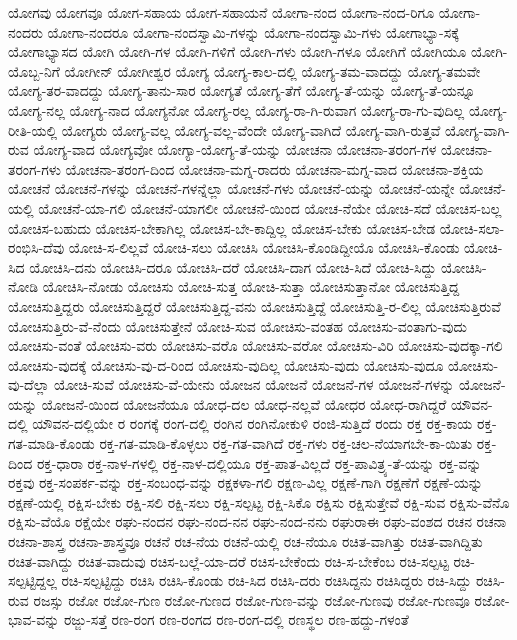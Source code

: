 {ಯೋಗವು
ಯೋಗವೂ
ಯೋಗ-ಸಹಾಯ
ಯೋಗ-ಸಹಾಯನೆ
ಯೋಗಾ-ನಂದ
ಯೋಗಾ-ನಂದ-ರಿಗೂ
ಯೋಗಾ-ನಂದರು
ಯೋಗಾ-ನಂದರೂ
ಯೋಗಾ-ನಂದಸ್ವಾಮಿ-ಗಳನ್ನು
ಯೋಗಾ-ನಂದಸ್ವಾಮಿ-ಗಳು
ಯೋಗಾಭ್ಯಾ-ಸಕ್ಕೆ
ಯೋಗಾಭ್ಯಾಸದ
ಯೋಗಿ
ಯೋಗಿ-ಗಳ
ಯೋಗಿ-ಗಳಿಗೆ
ಯೋಗಿ-ಗಳು
ಯೋಗಿ-ಗಳೂ
ಯೋಗಿಗೆ
ಯೋಗಿಯೂ
ಯೋಗಿ-ಯೊಬ್ಬ-ನಿಗೆ
ಯೋಗೀನ್
ಯೋಗೀಶ್ವರ
ಯೋಗ್ಯ
ಯೋಗ್ಯ-ಕಾಲ-ದಲ್ಲಿ
ಯೋಗ್ಯ-ತಮ-ವಾದದ್ದು
ಯೋಗ್ಯ-ತಮವೇ
ಯೋಗ್ಯ-ತರ-ವಾದದ್ದು
ಯೋಗ್ಯ-ತಾನು-ಸಾರ
ಯೋಗ್ಯತೆ
ಯೋಗ್ಯ-ತೆಗೆ
ಯೋಗ್ಯ-ತೆ-ಯನ್ನು
ಯೋಗ್ಯ-ತೆ-ಯನ್ನೂ
ಯೋಗ್ಯ-ನಲ್ಲ
ಯೋಗ್ಯ-ನಾದ
ಯೋಗ್ಯನೋ
ಯೋಗ್ಯ-ರಲ್ಲ
ಯೋಗ್ಯ-ರಾ-ಗಿ-ರುವಾಗ
ಯೋಗ್ಯ-ರಾ-ಗು-ವುದಿಲ್ಲ
ಯೋಗ್ಯ-ರೀತಿ-ಯಲ್ಲಿ
ಯೋಗ್ಯರು
ಯೋಗ್ಯ-ವಲ್ಲ
ಯೋಗ್ಯ-ವಲ್ಲ-ವೆಂದೇ
ಯೋಗ್ಯ-ವಾಗಿದೆ
ಯೋಗ್ಯ-ವಾಗಿ-ರುತ್ತವೆ
ಯೋಗ್ಯ-ವಾಗಿ-ರುವ
ಯೋಗ್ಯ-ವಾದ
ಯೋಗ್ಯವೋ
ಯೋಗ್ಯಾ-ಯೋಗ್ಯ-ತೆ-ಯನ್ನು
ಯೋಚನಾ
ಯೋಚನಾ-ತರಂಗ-ಗಳ
ಯೋಚನಾ-ತರಂಗ-ಗಳು
ಯೋಚನಾ-ತರಂಗ-ದಿಂದ
ಯೋಚನಾ-ಮಗ್ನ-ರಾದರು
ಯೋಚನಾ-ಮಗ್ನ-ವಾದ
ಯೋಚನಾ-ಶಕ್ತಿಯ
ಯೋಚನೆ
ಯೋಚನೆ-ಗಳನ್ನು
ಯೋಚನೆ-ಗಳನ್ನೆಲ್ಲಾ
ಯೋಚನೆ-ಗಳು
ಯೋಚನೆ-ಯನ್ನು
ಯೋಚನೆ-ಯನ್ನೇ
ಯೋಚನೆ-ಯಲ್ಲಿ
ಯೋಚನೆ-ಯಾ-ಗಲಿ
ಯೋಚನೆ-ಯಾಗಲೀ
ಯೋಚನೆ-ಯಿಂದ
ಯೋಚ-ನೆಯೇ
ಯೋಚಿ-ಸದೆ
ಯೋಚಿಸ-ಬಲ್ಲ
ಯೋಚಿಸ-ಬಹುದು
ಯೋಚಿಸ-ಬೇಕಾಗಿಲ್ಲ
ಯೋಚಿಸ-ಬೇ-ಕಾದ್ದಿಲ್ಲ
ಯೋಚಿಸ-ಬೇಕು
ಯೋಚಿಸ-ಬೇಡ
ಯೋಚಿ-ಸಲಾ-ರಂಭಿಸಿ-ದೆವು
ಯೋಚಿ-ಸ-ಲಿಲ್ಲವೆ
ಯೋಚಿ-ಸಲು
ಯೋಚಿಸಿ
ಯೋಚಿಸಿ-ಕೊಂಡಿದ್ದೀಯೊ
ಯೋಚಿಸಿ-ಕೊಂಡು
ಯೋಚಿ-ಸಿದ
ಯೋಚಿಸಿ-ದನು
ಯೋಚಿಸಿ-ದರೂ
ಯೋಚಿಸಿ-ದರೆ
ಯೋಚಿಸಿ-ದಾಗ
ಯೋಚಿ-ಸಿದೆ
ಯೋಚಿ-ಸಿದ್ದು
ಯೋಚಿಸಿ-ನೋಡಿ
ಯೋಚಿಸಿ-ನೋಡು
ಯೋಚಿಸು
ಯೋಚಿ-ಸುತ್ತ
ಯೋಚಿ-ಸುತ್ತಾ
ಯೋಚಿಸುತ್ತಾನೋ
ಯೋಚಿಸುತ್ತಿದ್ದ
ಯೋಚಿಸುತ್ತಿದ್ದರು
ಯೋಚಿಸುತ್ತಿದ್ದರೆ
ಯೋಚಿಸುತ್ತಿದ್ದ-ವನು
ಯೋಚಿಸುತ್ತಿದ್ದೆ
ಯೋಚಿಸುತ್ತಿ-ರ-ಲಿಲ್ಲ
ಯೋಚಿಸುತ್ತಿರುವೆ
ಯೋಚಿಸುತ್ತಿರು-ವೆ-ನೆಂದು
ಯೋಚಿಸುತ್ತೇನೆ
ಯೋಚಿ-ಸುವ
ಯೋಚಿಸು-ವಂತಹ
ಯೋಚಿಸು-ವಂತಾಗು-ವುದು
ಯೋಚಿಸು-ವಂತೆ
ಯೋಚಿಸು-ವರು
ಯೋಚಿಸು-ವರೊ
ಯೋಚಿಸು-ವರೋ
ಯೋಚಿಸು-ವಿರಿ
ಯೋಚಿಸು-ವುದಕ್ಕಾ-ಗಲಿ
ಯೋಚಿಸು-ವುದಕ್ಕೆ
ಯೋಚಿಸು-ವು-ದ-ರಿಂದ
ಯೋಚಿಸು-ವುದಿಲ್ಲ
ಯೋಚಿಸು-ವುದು
ಯೋಚಿಸು-ವುದೂ
ಯೋಚಿಸು-ವು-ದೆಲ್ಲಾ
ಯೋಚಿ-ಸುವೆ
ಯೋಚಿಸು-ವೆ-ಯೇನು
ಯೋಜನ
ಯೋಜನೆ
ಯೋಜನೆ-ಗಳ
ಯೋಜನೆ-ಗಳನ್ನು
ಯೋಜನೆ-ಯನ್ನು
ಯೋಜನೆ-ಯಿಂದ
ಯೋಜನೆಯೂ
ಯೋಧ-ದಲ
ಯೋಧ-ನಲ್ಲವೆ
ಯೋಧರ
ಯೋಧ-ರಾಗಿದ್ದರೆ
ಯೌವನ-ದಲ್ಲಿ
ಯೌವನ-ದಲ್ಲಿಯೇ
ರ
ರಂಗಕ್ಕೆ
ರಂಗ-ದಲ್ಲಿ
ರಂಗಿನ
ರಂಗಿನೋಕುಳಿ
ರಂಜಿ-ಸುತ್ತಿದೆ
ರಂದು
ರಕ್ತ
ರಕ್ತ-ಕಾಯ
ರಕ್ತ-ಗತ-ಮಾಡಿ-ಕೊಂಡು
ರಕ್ತ-ಗತ-ಮಾಡಿ-ಕೊಳ್ಳಲು
ರಕ್ತ-ಗತ-ವಾಗಿದೆ
ರಕ್ತ-ಗಳು
ರಕ್ತ-ಚಲ-ನೆಯಾಗಬೇ-ಕಾ-ಯಿತು
ರಕ್ತ-ದಿಂದ
ರಕ್ತ-ಧಾರಾ
ರಕ್ತ-ನಾಳ-ಗಳಲ್ಲಿ
ರಕ್ತ-ನಾಳ-ದಲ್ಲಿಯೂ
ರಕ್ತ-ಪಾತ-ವಿಲ್ಲದೆ
ರಕ್ತ-ಪಾವಿತ್ರ್ಯ-ತೆ-ಯನ್ನು
ರಕ್ತ-ವನ್ನು
ರಕ್ತವು
ರಕ್ತ-ಸಂಪರ್ಕ-ವನ್ನು
ರಕ್ತ-ಸಂಬಂಧ-ವನ್ನು
ರಕ್ಷಕಳಾ-ಗಲಿ
ರಕ್ಷಣ-ವಿಲ್ಲ
ರಕ್ಷಣೆ-ಗಾಗಿ
ರಕ್ಷಣೆಗೆ
ರಕ್ಷಣೆ-ಯನ್ನು
ರಕ್ಷಣೆ-ಯಲ್ಲಿ
ರಕ್ಷಿಸ-ಬೇಕು
ರಕ್ಷಿ-ಸಲಿ
ರಕ್ಷಿ-ಸಲು
ರಕ್ಷಿ-ಸಲ್ಪಟ್ಟ
ರಕ್ಷಿ-ಸಿಕೊ
ರಕ್ಷಿಸು
ರಕ್ಷಿಸುತ್ತೇವೆ
ರಕ್ಷಿ-ಸುವ
ರಕ್ಷಿಸು-ವೆನೊ
ರಕ್ಷಿಸು-ವೆಯೊ
ರಕ್ಷೆಯೇ
ರಘು-ನಂದನ
ರಘು-ನಂದ-ನನ
ರಘು-ನಂದ-ನನು
ರಘುರಾಈ
ರಘು-ವಂಶದ
ರಚನ
ರಚನಾ
ರಚನಾ-ಶಾಸ್ತ್ರ
ರಚನಾ-ಶಾಸ್ತ್ರವೂ
ರಚನೆ
ರಚ-ನೆಯ
ರಚನೆ-ಯಲ್ಲಿ
ರಚ-ನೆಯೂ
ರಚಿತ-ವಾಗಿತ್ತು
ರಚಿತ-ವಾಗಿದ್ದಿತು
ರಚಿತ-ವಾಗಿದ್ದು
ರಚಿತ-ವಾದುವು
ರಚಿಸ-ಬಲ್ಲೆ-ಯಾ-ದರೆ
ರಚಿಸ-ಬೇಕೆಂದು
ರಚಿ-ಸ-ಬೇಕೆಂಬ
ರಚಿ-ಸಲ್ಪಟ್ಟ
ರಚಿ-ಸಲ್ಪಟ್ಟಿದ್ದಲ್ಲ
ರಚಿ-ಸಲ್ಪಟ್ಟಿದ್ದು
ರಚಿಸಿ
ರಚಿಸಿ-ಕೊಂಡು
ರಚಿ-ಸಿದ
ರಚಿಸಿ-ದರು
ರಚಿಸಿದ್ದನು
ರಚಿಸಿದ್ದರು
ರಚಿ-ಸಿದ್ದು
ರಚಿಸಿ-ರುವ
ರಜಸ್ಸು
ರಜೋ
ರಜೋ-ಗುಣ
ರಜೋ-ಗುಣದ
ರಜೋ-ಗುಣ-ವನ್ನು
ರಜೋ-ಗುಣವು
ರಜೋ-ಗುಣವೂ
ರಜೋ-ಭಾವ-ವನ್ನು
ರಜ್ಜು-ಸತ್ತೆ
ರಣ-ರಂಗ
ರಣ-ರಂಗದ
ರಣ-ರಂಗ-ದಲ್ಲಿ
ರಣಸ್ಥಲ
ರಣ-ಹದ್ದು-ಗಳಂತೆ
}
